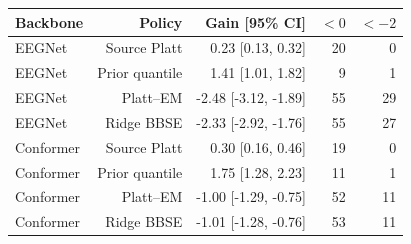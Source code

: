 \begin{tabular}{@{}lrrrr@{}}\toprule
Backbone & Policy & Gain [95\% CI] & $<0$ & $<-2$ \\\midrule
EEGNet & Source Platt & 0.23 [0.13, 0.32] & 20 & 0 \\
EEGNet & Prior quantile & 1.41 [1.01, 1.82] & 9 & 1 \\
EEGNet & Platt--EM & -2.48 [-3.12, -1.89] & 55 & 29 \\
EEGNet & Ridge BBSE & -2.33 [-2.92, -1.76] & 55 & 27 \\
Conformer & Source Platt & 0.30 [0.16, 0.46] & 19 & 0 \\
Conformer & Prior quantile & 1.75 [1.28, 2.23] & 11 & 1 \\
Conformer & Platt--EM & -1.00 [-1.29, -0.75] & 52 & 11 \\
Conformer & Ridge BBSE & -1.01 [-1.28, -0.76] & 53 & 11 \\
\bottomrule\end{tabular}
